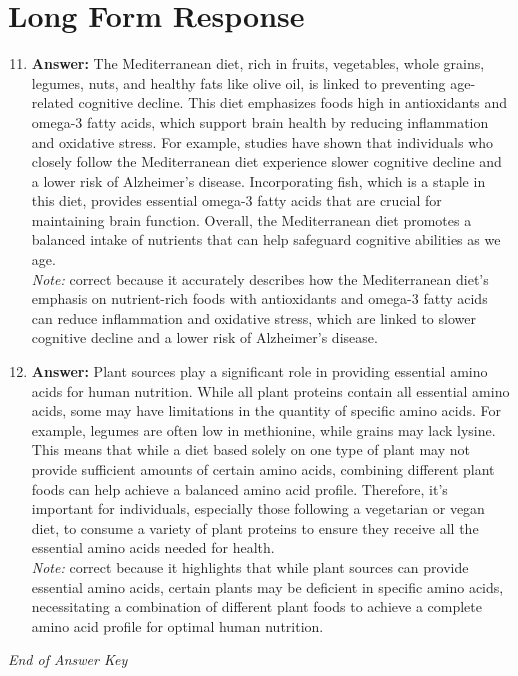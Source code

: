 \documentclass[12pt]{article}
\begin{document}
\section*{Long Form Response}
\begin{enumerate}[label=\arabic*.]
\setcounter{enumi}{10}
\item \textbf{Answer:} The Mediterranean diet, rich in fruits, vegetables, whole grains, legumes, nuts, and healthy fats like olive oil, is linked to preventing age-related cognitive decline. This diet emphasizes foods high in antioxidants and omega-3 fatty acids, which support brain health by reducing inflammation and oxidative stress. For example, studies have shown that individuals who closely follow the Mediterranean diet experience slower cognitive decline and a lower risk of Alzheimer's disease. Incorporating fish, which is a staple in this diet, provides essential omega-3 fatty acids that are crucial for maintaining brain function. Overall, the Mediterranean diet promotes a balanced intake of nutrients that can help safeguard cognitive abilities as we age.
\\ \textit{Note:} correct because it accurately describes how the Mediterranean diet's emphasis on nutrient-rich foods with antioxidants and omega-3 fatty acids can reduce inflammation and oxidative stress, which are linked to slower cognitive decline and a lower risk of Alzheimer's disease.
\item \textbf{Answer:} Plant sources play a significant role in providing essential amino acids for human nutrition. While all plant proteins contain all essential amino acids, some may have limitations in the quantity of specific amino acids. For example, legumes are often low in methionine, while grains may lack lysine. This means that while a diet based solely on one type of plant may not provide sufficient amounts of certain amino acids, combining different plant foods can help achieve a balanced amino acid profile. Therefore, it's important for individuals, especially those following a vegetarian or vegan diet, to consume a variety of plant proteins to ensure they receive all the essential amino acids needed for health.
\\ \textit{Note:} correct because it highlights that while plant sources can provide essential amino acids, certain plants may be deficient in specific amino acids, necessitating a combination of different plant foods to achieve a complete amino acid profile for optimal human nutrition.
\end{enumerate}

\vfill
\noindent\textit{End of Answer Key}
\end{document}
